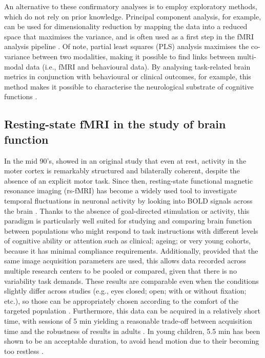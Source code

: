An alternative to these confirmatory analyses is to employ exploratory methods, which do not rely on prior knowledge. Principal component analysis, for example, can be used for dimensionality reduction by mapping the data into a reduced space that maximises the variance, and is often used as a first step in the fMRI analysis pipeline \citep{Zhong2009}. Of note, partial least squares (PLS) analysis \citep{Randal2004} maximises the co-variance between two modalities, making it possible to find links between multi-modal data (i.e., fMRI and behavioural data). By analysing task-related brain metrics in conjunction with behavioural or clinical outcomes, for example, this method makes it possible to characterise the neurological substrate of cognitive functions \citep{Roberts2017}.





\subsection{Resting-state fMRI in the study of brain function} \label{subsec:ch2_restingState}

In the mid 90's, \citep{Biswal1995} showed in an original study that even at rest, activity in the moter cortex is remarkably structured and bilaterally coherent, despite the absence of an explicit motor task. Since then, resting-state functional magnetic resonance imaging (rs-fMRI) has become a widely used tool to investigate temporal fluctuations in neuronal activity by looking into  BOLD signals across the brain \citep{Damoiseaux2006, Fox2007}. Thanks to the absence of goal-directed stimulation or activity, this paradigm is particularly well suited for studying and comparing brain function between populations who might respond to task instructions with different levels of cognitive ability or attention such as clinical; ageing; or very young cohorts, because it has minimal compliance requirements. Additionally, provided that the same image acquisition parameters are used, this allows data recorded across multiple research centers to be pooled or compared, given that there is no variability task demands. These results are comparable even when the conditions slightly differ across studies (e.g., eyes closed; open; with or without fixation; etc.), so those can be appropriately chosen according to the comfort of the targeted population \citep{Soares2016}. Furthermore, this data can be acquired in a relatively short time, with sessions of 5 min yielding a reasonable trade-off between acquisition time and the robustness of results in adults \citep{VanDijk2010, Whitlow2011}. In young children, 5.5 min has been shown to be an acceptable duration, to avoid head motion due to their becoming too restless \citep{White2014a}. 

